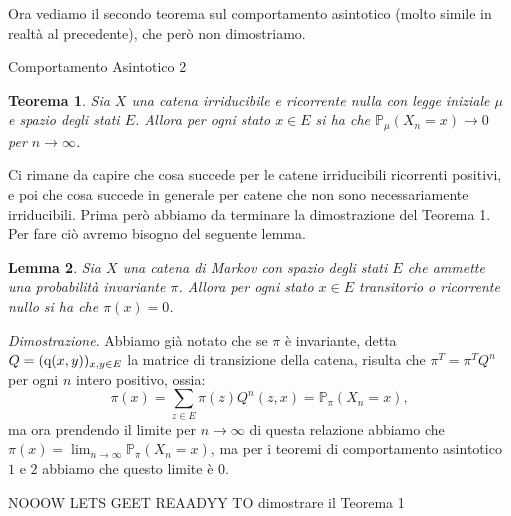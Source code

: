 \documentclass[11pt]{book}
\makeatletter
\theoremstyle{Definizione}
\theoremstyle{TeoremaProposizioneLemmaCorollario}
\newtheorem{myteo}{Teorema}[section]
\newtheorem{mylem}[myteo]{Lemma}
\theoremstyle{OsservazioneNota}
\renewenvironment{proof}[1][\proofname]{\par
  \normalfont \topsep6\p@\@plus6\p@\relax
  \trivlist
  \item[\hskip\labelsep
        \itshape
    #1\@addpunct{.}]\ignorespaces
}{%
  \endtrivlist\@endpefalse
}
\renewcommand{\P}{\mathbb{P}}
\newcommand{\q}{\textup{q}}
\renewenvironment{proof}{\textsl{Dimostrazione}.}{}
\makeatother
\begin{document}
\noindent
Ora vediamo il secondo teorema sul comportamento asintotico (molto simile in realtà al precedente), che però non dimostriamo.
\begin{boxteo}{Comportamento Asintotico 2}
\begin{myteo}
Sia $X$ una catena irriducibile e ricorrente nulla con legge iniziale $\mu$ e spazio degli stati $E$. Allora per ogni stato $x\in E$ si ha che $\P_\mu(X_n = x) \to 0$ per $n \to \infty$.
\end{myteo}
\end{boxteo}
\noindent
Ci rimane da capire che cosa succede per le catene irriducibili ricorrenti positivi, e poi che cosa succede in generale per catene che non sono necessariamente irriducibili. Prima però abbiamo da terminare la dimostrazione del Teorema 1.\\
Per fare ciò avremo bisogno del seguente lemma.
\begin{boxoss}
\begin{mylem}
Sia $X$ una catena di Markov con spazio degli stati $E$ che ammette una probabilità invariante $\pi$. Allora per ogni stato $x\in E$ transitorio o ricorrente nullo si ha che $\pi(x) = 0$.
\end{mylem}
\tcblower
\begin{proof}
Abbiamo già notato che se $\pi$ è invariante, detta $Q = (\q(x,y))_{x,y\in E}$ la matrice di transizione della catena, risulta che $\pi^T = \pi^TQ^n$ per ogni $n$ intero positivo, ossia:
$$
\pi(x) = \sum_{z\in E} \pi(z)Q^n(z,x) = \P_\pi(X_n = x),
$$
ma ora prendendo il limite per $n\to \infty$ di questa relazione abbiamo che $\pi(x) = \lim_{n\to\infty} \P_\pi(X_n = x)$, ma per i teoremi di comportamento asintotico $1$ e $2$ abbiamo che questo limite è $0$.
\end{proof}
\end{boxoss}
\noindent
NOOOW LETS GEET REAADYY TO dimostrare il Teorema 1
\end{document}

